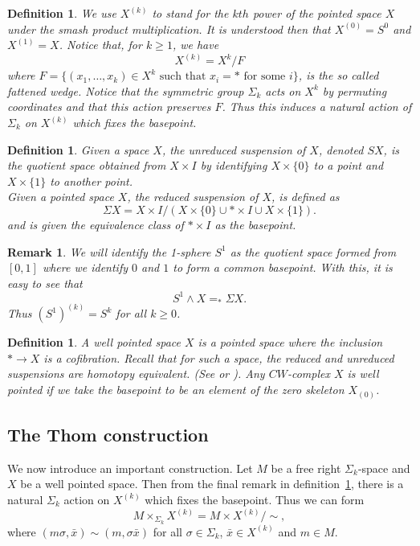 \documentclass{amsart}
\newtheorem{rem}[thm]{Remark}
\newtheorem{defn}[thm]{Definition}
\begin{document}
\begin{defn}
\label{rem: sigmakactiononwedge}
We use $X^{(k)}$ to stand for the $kth$ power of the pointed space $X$
under the smash product multiplication. It is understood then that
$X^{(0)}=S^0$ and $X^{(1)}=X$. Notice that, for $k \geq 1$, we have 
$$
X^{(k)} = X^k/F
$$
where $F=\{ (x_1,\dots,x_k) \in X^k \text{ such that } x_i = *
\text{ for some } i \}$, is the so called fattened wedge. 
Notice that the symmetric group $\Sigma_k$ acts on $X^k$
by permuting coordinates and that this action preserves $F$.
Thus this induces a natural action of $\Sigma_k$ on $X^{(k)}$
which fixes the basepoint.
\end{defn}

\begin{defn}
Given a space $X$, the unreduced suspension of $X$,
denoted $SX$, is the quotient space obtained from $X \times I$
by identifying $X \times \{0\}$ to a point and
$X \times \{1\}$ to another point. \\
Given a pointed space $X$, the reduced suspension of $X$,
is defined as
$$
\Sigma X = X \times I/(X \times \{0\} \cup * \times I \cup
X \times \{1\}).
$$
and is given the equivalence class of $* \times I$ as the basepoint.
\end{defn}

\begin{rem}
We will identify the 1-sphere $S^1$ as the quotient space formed
from $[0,1]$ where we identify $0$ and $1$ to form a common basepoint.
With this, it is easy to see that
$$
S^1 \wedge X =_* \Sigma X.
$$
Thus $(S^1)^{(k)}=S^k$ for all $k \geq 0$.
\end{rem}

\begin{defn}
A well pointed space $X$ is a pointed space where the inclusion
$* \rightarrow X$ is a cofibration. Recall that for such a space,
the reduced and unreduced suspensions are homotopy equivalent. (See
\cite{Bred} or \cite{Span}). Any $CW$-complex $X$ is well pointed
if we take the basepoint to be an element of the zero skeleton
$X_{(0)}$.
\end{defn}

\subsection{The Thom construction}

We now introduce an important construction.
Let $M$ be a free right $\Sigma_k$-space and $X$ be a well pointed space.
Then from the final remark in definition~\ref{rem: sigmakactiononwedge},
there is a natural $\Sigma_k$ action on $X^{(k)}$ which fixes the basepoint.
Thus we can form
$$
M \times_{\Sigma_k} X^{(k)} = M \times X^{(k)}/\sim,
$$ 
where $(m \sigma, \bar{x}) \sim (m, \sigma \bar{x})$ for all
$\sigma \in \Sigma_k$, $\bar{x} \in X^{(k)}$ and $m \in M$.
\end{document}
